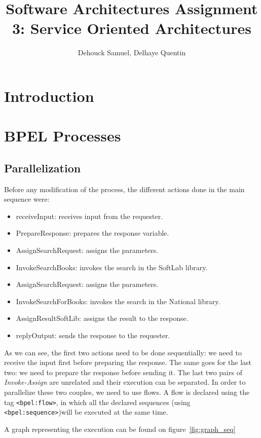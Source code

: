 \documentclass[a4paper,10pt]{article}
\title{Software Architectures
Assignment 3: Service Oriented Architectures}
\author{Dehouck Samuel, Delhaye Quentin}
\begin{document}
\maketitle

\section{Introduction}

\section{BPEL Processes}

\subsection{Parallelization}
Before any modification of the process, the different actions done in the main sequence were:
\begin{itemize}
 \item receiveInput: receives input from the requester.
 \item PrepareResponse: prepares the response variable.
 \item AssignSearchRequest: assigns the parameters.
 \item InvokeSearchBooks: invokes the search in the SoftLab library. 
 \item AssignSearchRequest: assigns the parameters.
 \item InvokeSearchForBooks: invokes the search in the National library.
 \item AssignResultSoftLib: assigns the result to the response.
 \item replyOutput: sends the response to the requester.
\end{itemize}

As we can see, the first two actions need to be done sequentially: we need to receive the input first before preparing the response. The same goes for the last two: we need to prepare the response before sending it.
The last two pairs of \textit{Invoke-Assign} are unrelated and their execution can be separated.
In order to parallelize these two couples, we need to use flows. A flow is declared using the tag \texttt{\textless bpel:flow\textgreater}, in which all the declared sequences (using \texttt{\textless bpel:sequence\textgreater})will be executed at the same time.

A graph representing the execution can be found on figure~\ref{fig:graph_seq}
\end{document}
